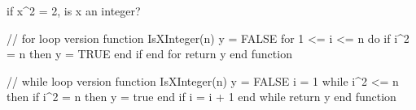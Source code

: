 if x^2 = 2, is x an integer?

// for loop version
function IsXInteger(n)
  y = FALSE
  for 1 <= i <= n do
    if i^2 = n then
      y = TRUE
    end if
  end for
  return y
end function

// while loop version
function IsXInteger(n)
  y = FALSE
  i = 1
  while i^2 <= n then
    if i^2 = n then
      y = true
    end if
  i = i + 1
  end while
  return y
end function


